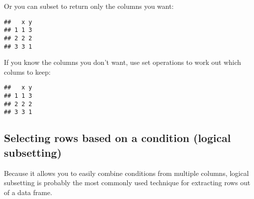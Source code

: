 Or you can subset to return only the columns you want:

\begin{Shaded}
\begin{Highlighting}[]
\StringTok{ }\NormalTok{(} \OperatorTok{:}\NormalTok{, } \OperatorTok{:}\NormalTok{, }\NormalTok{ letters[}\OperatorTok{:}\NormalTok{])}
\NormalTok{df[}\NormalTok{(}\NormalTok{, }\NormalTok{)]}
\end{Highlighting}
\end{Shaded}

\begin{verbatim}
##   x y
## 1 1 3
## 2 2 2
## 3 3 1
\end{verbatim}

If you know the columns you don't want, use set operations to work out
which colums to keep:

\begin{Shaded}
\begin{Highlighting}[]
\NormalTok{df[}\NormalTok{(}\NormalTok{)]}
\end{Highlighting}
\end{Shaded}

\begin{verbatim}
##   x y
## 1 1 3
## 2 2 2
## 3 3 1
\end{verbatim}

\hypertarget{selecting-rows-based-on-a-condition-logical-subsetting}{%
\subsection{Selecting rows based on a condition (logical
subsetting)}\label{selecting-rows-based-on-a-condition-logical-subsetting}}

Because it allows you to easily combine conditions from multiple
columns, logical subsetting is probably the most commonly used technique
for extracting rows out of a data frame.

\begin{Shaded}
\begin{Highlighting}[]
\NormalTok{mtcars[mtcars}\OperatorTok{$}\OperatorTok{==}\StringTok{ }\NormalTok{, ]}
\end{Highlighting}
\end{Shaded}

